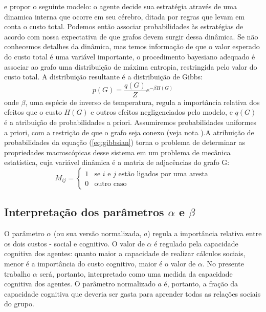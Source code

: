  e propor o seguinte modelo: o agente decide sua estratégia através de uma dinamica interna que ocorre em seu cérebro, ditada por regras que levam em conta o custo total. Podemos então associar probabilidades às estratégias de acordo com nossa expectativa de que grafos devem surgir dessa dinâmica. Se não conhecemos detalhes da dinâmica, mas temos informação de que o valor esperado do custo total é uma variável importante, o procedimento bayesiano adequado é associar ao grafo uma distribuição de máxima entropia, restringida pelo valor do custo total. A distribuição resultante é a distribuição de Gibbs:
\begin{equation}
   \label{eq:gibbsian}
   p(G) = \frac{q(G)}{Z} e^{-\beta H(G)}
\end{equation}
onde $\beta$, uma espécie de inverso de temperatura, regula a importância relativa dos efeitos que o custo \(H(G)\) e outros efeitos negligenciados pelo modelo, e \(q(G)\) é a atribuição de probabilidades a priori. Assumiremos probabilidades uniformes a priori, com a restrição de que o grafo seja conexo (veja nota \footnotemark[\value{footnote}]).A atribuição de probabilidades da equação (\ref{eq:gibbsian}) torna o problema de determinar as propriedades macroscópicas desse sistema em um problema de mecânica estatística, cuja variável dinâmica é a matriz de adjacências do grafo G:
\begin{equation}
  M_{ij} = \begin{cases}
      1  & \text{se $i$ e $j$ estão ligados por uma aresta} \\
      0  & \text{outro caso}
           \end{cases}
\end{equation}
\subsection{Interpretação dos parâmetros $\alpha$ e $\beta$}

O parâmetro $\alpha$ (ou sua versão normalizada, $a$) regula a importância relativa entre os dois custos - social e cognitivo. O valor de $\alpha$ é regulado pela capacidade cognitiva dos agentes: quanto maior a capacidade de realizar cálculos sociais, menor é a importância do custo cognitivo, maior é o valor de $\alpha$. No presente trabalho $\alpha$ será, portanto, interpretado como uma medida da capacidade cognitiva dos agentes. O parâmetro normalizado $a$ é, portanto, a fração da capacidade cognitiva que deveria ser gasta para aprender todas as relações sociais do grupo. 

